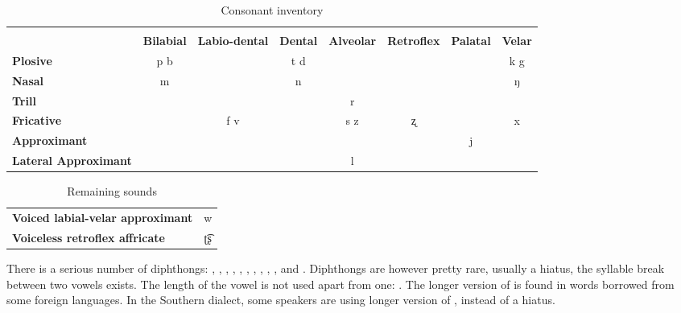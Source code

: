 \begin{table}
    \caption{Consonant inventory}
    \begin{tabular}{lccccccc}
        \\
        \\
                                     & \textbf{Bilabial} & \textbf{Labio-dental} & \textbf{Dental} & \textbf{Alveolar} & \textbf{Retroflex} & \textbf{Palatal} & \textbf{Velar} \\
        \textbf{Plosive}             & p b               &                       & t d             &                   &                    &                  & k g            \\
        \textbf{Nasal}               & m                 &                       & n               &                   &                    &                  & ŋ              \\
        \textbf{Trill}               &                   &                       &                 & r                 &                    &                  &                \\
        \textbf{Fricative}           &                   & f v                   &                 & s z               & ʐ                  &                  & x              \\
        \textbf{Approximant}         &                   &                       &                 &                   &                    & j                &                \\
        \textbf{Lateral Approximant} &                   &                       &                 & l                 &                    &                  &                \\
    \end{tabular}
    \label{tab:consonants}
\end{table}

\begin{table}
    \caption{Remaining sounds}
    \begin{tabular}{lc}
        \textbf{Voiced labial-velar approximant} & w  \\
        \textbf{Voiceless retroflex affricate}   & ʈ͡ʂ
    \end{tabular}
    \label{tab:consonants2}
\end{table}

There is a serious number of diphthongs: , , , ,
, , , , , ,  and .
Diphthongs are however pretty rare, usually a hiatus, the syllable break between
two vowels exists. The length of the vowel is not used apart from one: .
The longer version of  is found in words borrowed from some foreign
languages. In the Southern dialect, some speakers are using longer version of
,  instead of a hiatus.

